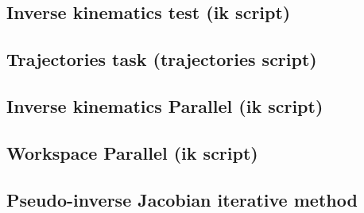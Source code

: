 \documentclass{article}
\begin{document}
\subsection{Inverse kinematics test (ik script)}
\label{apendix:lynx_ik_test}


\subsection{Trajectories task (trajectories script)}
\label{apendix:trajectories_script}


\subsection{Inverse kinematics Parallel (ik script)}
\label{apendix:parallel_ik_test}


\subsection{Workspace Parallel (ik script)}
\label{apendix:parallel_workspace}


\subsection{Pseudo-inverse Jacobian iterative method}
\label{apendix:iterative_method}




\end{document}
